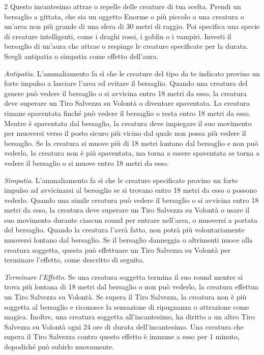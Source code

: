 \begin{multicols}{2}
Questo incantesimo attrae o repelle delle creature di tua scelta. Prendi un bersaglio a gittata, che sia un oggetto Enorme o più piccolo o una creatura o un'area non più grande di una sfera di 30 metri di raggio. Poi specifica una specie di creature intelligenti, come i draghi rossi, i goblin o i vampiri. Investi il bersaglio di un'aura che attrae o respinge le creature specificate per la durata. Scegli antipatia o simpatia come effetto dell'aura.

\emph{Antipatia}. L'ammaliamento fa sì che le creature del tipo da te indicato provino un forte impulso a lasciare l'area ed evitare il bersaglio. Quando una creatura del genere può vedere il bersaglio o si avvicina entro 18 metri da esso, la creatura deve superare un Tiro Salvezza su Volontà o diventare spaventata. La creatura rimane spaventata finché può vedere il bersaglio o resta entro 18 metri da esso. Mentre è spaventata dal bersaglio, la creatura deve impiegare il suo movimento per muoversi verso il posto sicuro più vicino dal quale non possa più vedere il bersaglio. Se la creatura si muove più di 18 metri lontano dal bersaglio e non può vederlo, la creatura non è più spaventata, ma torna a essere spaventata se torna a vedere il bersaglio o si muove entro 18 metri da esso.

\emph{Simpatia}. L'ammaliamento fa sì che le creature specificate provino un forte impulso ad avvicinarsi al bersaglio se si trovano entro 18 metri da esso o possono vederlo. Quando una simile creatura può vedere il bersaglio o si avvicina entro 18 metri da esso, la creatura deve superare un Tiro Salvezza su Volontà o usare il suo movimento durante ciascun round per entrare nell'area, o muoversi a portata del bersaglio. Quando la creatura l'avrà fatto, non potrà più volontariamente muoversi lontano dal bersaglio. Se il bersaglio danneggia o altrimenti nuoce alla creatura soggetta, questa può effettuare un Tiro Salvezza su Volontà per terminare l'effetto, come descritto di seguito.

\emph{Terminare l'Effetto}. Se una creatura soggetta termina il suo round mentre si trova più lontana di 18 metri dal bersaglio o non può vederlo, la creatura effettua un Tiro Salvezza su Volontà. Se supera il Tiro Salvezza, la creatura non è più soggetta al bersaglio e riconosce la sensazione di ripugnanza o attrazione come magica. Inoltre, una creatura soggetta all'incantesimo, ha diritto a un altro Tiro Salvezza su Volontà ogni 24 ore di durata dell'incantesimo. Una creatura che supera il Tiro Salvezza contro questo effetto è immune a esso per 1 minuto, dopodiché può subirlo nuovamente.


\end{multicols}

